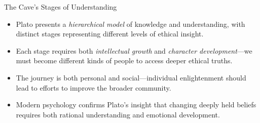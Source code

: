 \documentclass[aspectratio=169]{beamer}
\begin{document}
\begin{frame}{The Cave's Stages of Understanding}
\begin{itemize}
\item Plato presents a \emph{hierarchical model} of knowledge and understanding, with distinct stages representing different levels of ethical insight.
\item Each stage requires both \emph{intellectual growth} and \emph{character development}—we must become different kinds of people to access deeper ethical truths.
\item The journey is both personal and social—individual enlightenment should lead to efforts to improve the broader community.
\item Modern psychology confirms Plato's insight that changing deeply held beliefs requires both rational understanding and emotional development.
\end{itemize}
\end{frame}
\end{document}
